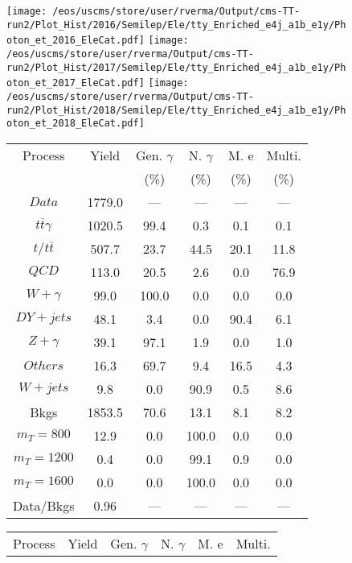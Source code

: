 \begin{figure}
\centering
\texttt{[image: /eos/uscms/store/user/rverma/Output/cms-TT-run2/Plot\_Hist/2016/Semilep/Ele/tty\_Enriched\_e4j\_a1b\_e1y/Photon\_et\_2016\_EleCat.pdf]}
\texttt{[image: /eos/uscms/store/user/rverma/Output/cms-TT-run2/Plot\_Hist/2017/Semilep/Ele/tty\_Enriched\_e4j\_a1b\_e1y/Photon\_et\_2017\_EleCat.pdf]}
\texttt{[image: /eos/uscms/store/user/rverma/Output/cms-TT-run2/Plot\_Hist/2018/Semilep/Ele/tty\_Enriched\_e4j\_a1b\_e1y/Photon\_et\_2018\_EleCat.pdf]}
\begin{minipage}[c]{0.32\textwidth}
\centering
\tiny{
\begin{tabular}{cccccc}
\hline
Process & Yield & Gen. $\gamma$ & N. $\gamma$ & M. e & Multi. \\
 &  & (\%) & (\%) & (\%) & (\%)  \\
\hline
                                                                      $ Data $ &  1779.0 &  --- &  --- &  --- &  ---\\
$ t\bar{t}\gamma $ &  1020.5 &  99.4 &  0.3 &  0.1 &  0.1\\
$ t/t\bar{t} $ &  507.7 &  23.7 &  44.5 &  20.1 &  11.8\\
$ QCD $ &  113.0 &  20.5 &  2.6 &  0.0 &  76.9\\
$ W+\gamma $ &  99.0 &  100.0 &  0.0 &  0.0 &  0.0\\
$ DY+jets $ &  48.1 &  3.4 &  0.0 &  90.4 &  6.1\\
$ Z+\gamma $ &  39.1 &  97.1 &  1.9 &  0.0 &  1.0\\
$ Others $ &  16.3 &  69.7 &  9.4 &  16.5 &  4.3\\
$ W+jets $ &  9.8 &  0.0 &  90.9 &  0.5 &  8.6\\
Bkgs &  1853.5 &  70.6 &  13.1 &  8.1 &  8.2\\
$ m_{T} = 800 $ &  12.9 &  0.0 &  100.0 &  0.0 &  0.0\\
$ m_{T} = 1200 $ &  0.4 &  0.0 &  99.1 &  0.9 &  0.0\\
$ m_{T} = 1600 $ &  0.0 &  0.0 &  100.0 &  0.0 &  0.0\\
Data/Bkgs &  0.96 &  --- &  --- &  --- &  ---\\
\hline
\end{tabular}
}
\end{minipage}
\begin{minipage}[c]{0.32\textwidth}
\centering
\tiny{
\begin{tabular}{cccccc}
\hline
Process & Yield & Gen. $\gamma$ & N. $\gamma$ & M. e & Multi. \\

\end{tabular}}
\end{minipage}
\end{figure}
